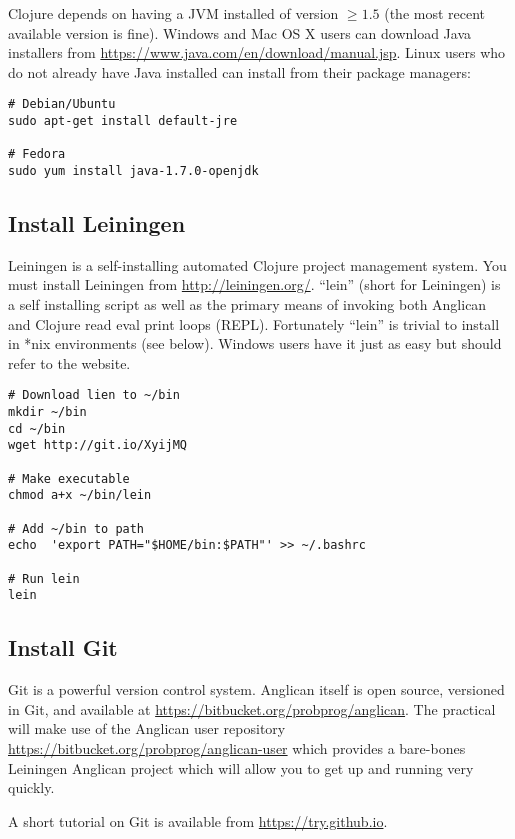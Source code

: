 \documentclass{article}
\begin{document}
Clojure depends on having a JVM installed of version $\geq 1.5$ (the most recent available version is fine).  Windows and Mac OS X users can download Java installers from \url{https://www.java.com/en/download/manual.jsp}. Linux users who do not already have Java installed can install from their package managers:

\begin{verbatim}
# Debian/Ubuntu
sudo apt-get install default-jre

# Fedora
sudo yum install java-1.7.0-openjdk
\end{verbatim}

\subsection{Install Leiningen}

Leiningen is a self-installing automated Clojure project management system.  
You must install Leiningen from \url{http://leiningen.org/}.  ``lein'' 
(short for Leiningen) is a self installing script as well as the primary means
of invoking both Anglican and Clojure read eval print loops (REPL).  Fortunately
``lein'' is trivial to install in *nix environments (see below).  Windows
users have it just as easy but should refer to the website.

\begin{verbatim}
# Download lien to ~/bin
mkdir ~/bin
cd ~/bin
wget http://git.io/XyijMQ

# Make executable
chmod a+x ~/bin/lein

# Add ~/bin to path
echo  'export PATH="$HOME/bin:$PATH"' >> ~/.bashrc 

# Run lein
lein
\end{verbatim}

\subsection{Install Git}

Git is a powerful version control system.  Anglican itself is open source, versioned in Git,
and available at \url{https://bitbucket.org/probprog/anglican}.  The practical will make use
of the Anglican user repository \url{https://bitbucket.org/probprog/anglican-user} which 
provides a bare-bones Leiningen Anglican project which will allow you to get up and running
very quickly.

A short tutorial on Git is available from \url{https://try.github.io}.
\end{document}
